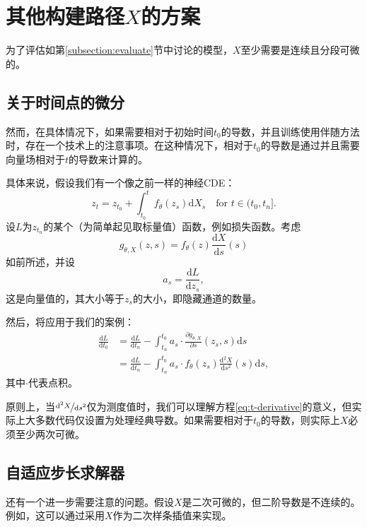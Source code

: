 \documentclass{ctexart}
\theoremstyle{plain}
\theoremstyle{definition}
\newcommand{\ttfrac}[2]{\nicefrac{#1}{#2}}
\begin{document}
	\section{其他构建路径$X$的方案}\label{appendix:other-schemes-for-x}
	为了评估如第\ref{subsection:evaluate}节中讨论的模型，$X$至少需要是连续且分段可微的。
	
	\subsection{关于时间点的微分}
	然而，在具体情况下，如果需要相对于初始时间$t_0$的导数，并且训练使用伴随方法时，存在一个技术上的注意事项。在这种情况下，相对于$t_0$的导数是通过并且需要向量场相对于$t$的导数来计算的。
	
 具体来说，假设我们有一个像之前一样的神经CDE：
\begin{equation*}
	z_t = z_{t_0} + \int_{t_0}^t f_\theta(z_s) \mathrm{d} X_s\quad\text{for $t \in (t_0, t_n]$}.
\end{equation*}
	设$L$为$z_{t_n}$的某个（为简单起见取标量值）函数，例如损失函数。考虑
\begin{equation*}
	g_{\theta, X}(z, s) = f_\theta(z) \frac{\mathrm{d}X}{\mathrm{d}s}(s)
\end{equation*}
	如前所述，并设
\begin{equation*}
	a_s = \frac{\mathrm{d}L}{\mathrm{d}z_s},
\end{equation*}
	这是向量值的，其大小等于$z_s$的大小，即隐藏通道的数量。
	
	然后，将\cite[Equation 52]{neural-odes}应用于我们的案例：
\begin{align}
	\frac{\mathrm{d} L}{\mathrm{d} t_0} &= \frac{\mathrm{d} L}{\mathrm{d} t_n}-\int_{t_n}^{t_0} a_s \cdot \frac{\partial g_{\theta, X}}{\partial s}(z_s, s) \mathrm{d}s\nonumber\\
	&= \frac{\mathrm{d} L}{\mathrm{d} t_n}-\int_{t_n}^{t_0} a_s \cdot f_\theta(z_s) \frac{\mathrm{d}^2 X}{\mathrm{d} s^2}(s) \mathrm{d}s,\label{eq:t-derivative}
\end{align}
	其中$\cdot$代表点积。
	
	原则上，当$\ttfrac{\mathrm{d}^2 X}{\mathrm{d} s^2}$仅为测度值时，我们可以理解方程\eqref{eq:t-derivative}的意义，但实际上大多数代码仅设置为处理经典导数。如果需要相对于$t_0$的导数，则实际上$X$必须至少两次可微。
	
	\subsection{自适应步长求解器}
	还有一个进一步需要注意的问题。假设$X$是二次可微的，但二阶导数是不连续的。例如，这可以通过采用$X$作为二次样条插值来实现。
	
\end{document}
